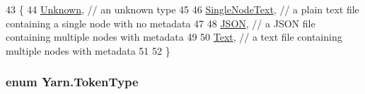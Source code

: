 \begin{DoxyCode}
43     \{
44         \hyperlink{a00041_ad7ebb46e7309ead8767383a672b3272fa88183b946cc5f0e8c96b2e66e1c74a7e}{Unknown}, \textcolor{comment}{// an unknown type}
45 
46         \hyperlink{a00041_ad7ebb46e7309ead8767383a672b3272faceeb33da53902872b63956f8df786cd8}{SingleNodeText}, \textcolor{comment}{// a plain text file containing a single node with no metadata}
47 
48         \hyperlink{a00041_ad7ebb46e7309ead8767383a672b3272fa0ecd11c1d7a287401d148a23bbd7a2f8}{JSON}, \textcolor{comment}{// a JSON file containing multiple nodes with metadata}
49 
50         \hyperlink{a00041_a301aa7c866593a5b625a8fc158bbeacea9dffbf69ffba8bc38bc4e01abf4b1675}{Text}, \textcolor{comment}{//  a text file containing multiple nodes with metadata}
51 
52     \}
\end{DoxyCode}
\hypertarget{a00041_a301aa7c866593a5b625a8fc158bbeace}{
\subsubsection[{Token\-Type}]{\setlength{\rightskip}{0pt plus 5cm}enum {\bf Yarn.\-Token\-Type}\hspace{0.3cm}{\ttfamily [package]}}}\label{a00041_a301aa7c866593a5b625a8fc158bbeace}
